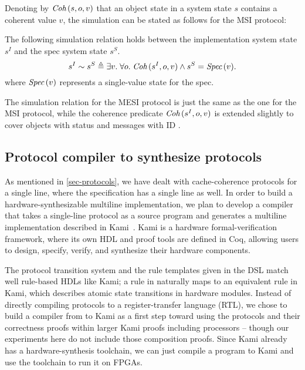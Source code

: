 Denoting by $\textit{Coh}\,(s, o, v)$ that an object state in a system state $s$ contains a coherent value $v$, the simulation can be stated as follows for the MSI protocol:
\begin{theorem}
  The following simulation relation holds between the implementation system state $s^I$ and the spec system state $s^S$.
  \begin{displaymath}
    s^I \sim s^S \triangleq \exists v.\; \forall o.\; \textit{Coh}\,(s^I, o, v) \wedge s^S = \textit{Spec}\,(v).
  \end{displaymath}
  where $\textit{Spec}\,(v)$ represents a single-value state for the spec.
\end{theorem}
The simulation relation for the MESI protocol is just the same as the one for the MSI protocol, while the coherence predicate $\textit{Coh}\,(s^I, o, v)$ is extended slightly to cover objects with \stE{} status and messages with ID .

\subsection{Protocol compiler to synthesize \hemiola{} protocols}
\label{sec-synthesis}

As mentioned in \autoref{sec-protocols}, we have dealt with cache-coherence protocols for a single line, where the specification has a single line as well.
In order to build a hardware-synthesizable multiline implementation, we plan to develop a compiler that takes a single-line \hemiola{} protocol as a source program and generates a multiline implementation described in Kami~\cite{kami}.
Kami is a hardware formal-verification framework, where its own HDL and proof tools are defined in Coq, allowing users to design, specify, verify, and synthesize their hardware components.

The protocol transition system and the rule templates given in the \hemiola{} DSL match well rule-based HDLs like Kami; a rule in \hemiola{} naturally maps to an equivalent rule in Kami, which describes atomic state transitions in hardware modules.
Instead of directly compiling \hemiola{} protocols to a register-transfer language (RTL), we chose to build a compiler from \hemiola{} to Kami as a first step toward using the protocols and their correctness proofs within larger Kami proofs including processors -- though our experiments here do not include those composition proofs.
Since Kami already has a hardware-synthesis toolchain, we can just compile a \hemiola{} program to Kami and use the toolchain to run it on FPGAs.

